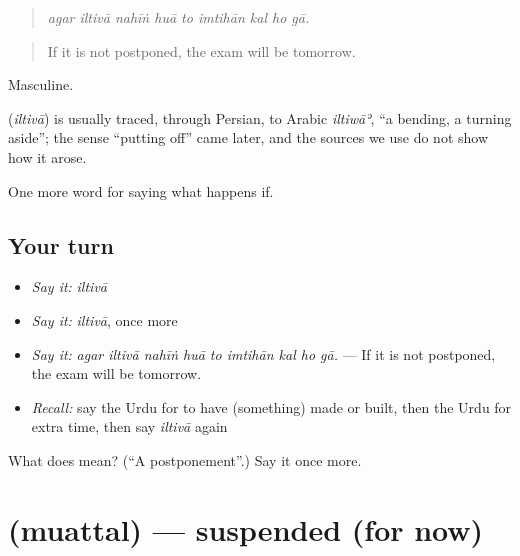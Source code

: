 \begin{quote}
        
\end{quote}

\begin{quote}
\emph{agar iltivā nahīṅ huā to imtihān kal ho gā.}
\end{quote}

\begin{quote}
If it is not postponed, the exam will be tomorrow.
\end{quote}

Masculine.

\begin{cousinweb}
\textbf{} (\emph{iltivā}) is usually traced, through Persian, to Arabic \emph{iltiwāʾ}, \textquotedblleft{}a bending, a turning aside\textquotedblright{}; the sense \textquotedblleft{}putting off\textquotedblright{} came later, and the sources we use do not show how it arose.
\end{cousinweb}

\begin{grammarlens}[title={What you've built}]
One more word for saying what happens if.
\end{grammarlens}

\subsection*{Your turn}
\begin{itemize}
\raggedright
  \item \emph{Say it:} \emph{iltivā}
  \item \emph{Say it:} \emph{iltivā}, once more
  \item \emph{Say it:} \emph{agar iltivā nahīṅ huā to imtihān kal ho gā.} — If it is not postponed, the exam will be tomorrow.
  \item \emph{Recall:} say the Urdu for to have (something) made or built, then the Urdu for extra time, then say \emph{iltivā} again
\end{itemize}

\begin{tcolorbox}[breakable,colback=teal!4,colframe=teal!35!black,title={Before you move on}]
What does  mean? (\textquotedblleft{}A postponement\textquotedblright{}.) Say it once more.
\end{tcolorbox}
\section[\texorpdfstring{\ur{معطل} (muattal)}{معطل (muattal)}]{ (muattal) — suspended (for now)}

